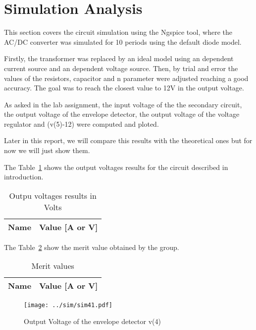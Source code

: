 \section{Simulation Analysis}
\label{sec:simulation}

\hspace{0,5cm} This section covers the circuit simulation using the Ngspice tool, where the AC/DC converter was simulated for 10 periods using the default diode model.
\par Firstly, the transformer was replaced by an ideal model using an dependent current source and an dependent voltage source. Then, by trial and error the values of the resistors, capacitor and n parameter were adjusted reaching a good accuracy. The goal was to reach the closest value to 12V in the output voltage.
\par As asked in the lab assignment, the input voltage of the the secondary circuit, the output voltage of the envelope detector, the output voltage of the voltage regulator and (v(5)-12) were computed and ploted.
\par Later in this report, we will compare this results with the theoretical ones but for now we will just show them.

The Table~\ref{tab:op1} shows the output voltages results for the circuit described in introduction.

\begin{table}[!ht]
  \centering
  \begin{tabular}{|l|r|}
    \hline    
    {\bf Name} & {\bf Value [A or V]} \\ \hline
    
  \end{tabular}
  \caption{Outpu voltages results in Volts}
  \label{tab:op1}
\end{table}

The Table~\ref{tab:op2} show the merit value obtained by the group.
\begin{table}[!ht]
  \centering
  \begin{tabular}{|l|r|}
    \hline    
    {\bf Name} & {\bf Value [A or V]} \\ \hline
    
  \end{tabular}
  \caption{Merit values}
  \label{tab:op2}
\end{table}

\begin{figure}[ht!] \centering
\texttt{[image: ../sim/sim41.pdf]}
\caption{Output Voltage of the envelope detector v(4)} 
\label{fig:sim41}
\end{figure}


